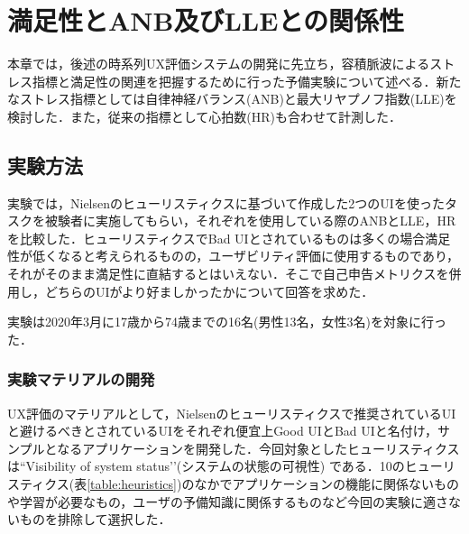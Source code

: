 \chapter{満足性とANB及びLLEとの関係性}
\label{chap:pulsewave}

本章では，後述の時系列UX評価システムの開発に先立ち，容積脈波によるストレス指標と満足性の関連を把握するために行った予備実験について述べる．新たなストレス指標としては自律神経バランス(ANB)と最大リヤプノフ指数(LLE)を検討した．また，従来の指標として心拍数(HR)も合わせて計測した．

\section{実験方法}

実験では，Nielsenのヒューリスティクスに基づいて作成した2つのUIを使ったタスクを被験者に実施してもらい，それぞれを使用している際のANBとLLE，HRを比較した．ヒューリスティクスでBad UIとされているものは多くの場合満足性が低くなると考えられるものの，ユーザビリティ評価に使用するものであり，それがそのまま満足性に直結するとはいえない．そこで自己申告メトリクスを併用し，どちらのUIがより好ましかったかについて回答を求めた．

実験は2020年3月に17歳から74歳までの16名(男性13名，女性3名)を対象に行った．

\subsection{実験マテリアルの開発}

UX評価のマテリアルとして，Nielsenのヒューリスティクスで推奨されているUIと避けるべきとされているUIをそれぞれ便宜上Good UIとBad UIと名付け，サンプルとなるアプリケーションを開発した．今回対象としたヒューリスティクスは``Visibility of system status'’(システムの状態の可視性)\cite{nielsen1990} である．10のヒューリスティクス(表\ref{table:heuristics})のなかでアプリケーションの機能に関係ないものや学習が必要なもの，ユーザの予備知識に関係するものなど今回の実験に適さないものを排除して選択した．

